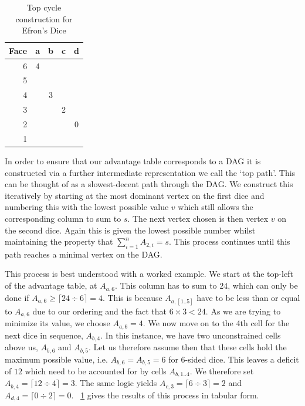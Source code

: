 \documentclass[a4paper,twocolumn]{article}
\begin{document}
\begin{table}
\begin{center}


	\begin{tabular}{|r|c|c|c|c|} 
	\hline
	Face & a & b & c & d  \\ 
	\hline\hline

 6& 4 &   &   &   \\ \hline
 5&  &   &   &   \\ \hline
 4&  & 3 &   &   \\\hline
 3&  &   &  2 &   \\\hline
 2&  &   &   & 0  \\\hline
 1&  &   &   &   \\
 
 	\hline
 	
	 \end{tabular} 

\end{center}
\caption{Top cycle construction for Efron's Dice}
\label{tab:toppath:efron}
\end{table}



In order to ensure that our advantage table corresponds to a DAG it is constructed via a further intermediate representation we call the `top path'. This can be thought of as a slowest-decent path through the DAG. We construct this iteratively by starting at the most dominant vertex on the first dice and numbering this with the lowest possible value $v$ which still allows the corresponding column to sum to $s$. The next vertex chosen is then vertex $v$ on the second dice. Again this is given the lowest possible number whilst maintaining the property that $\sum\limits_{i=1}^n A_{2,i} = s$. This process continues until this path reaches a minimal vertex on the DAG. 

This process is best understood with a worked example. We start at the top-left of the advantage table, at $A_{a,6}$. This column has to sum to $24$, which can only be done if $A_{a,6} \geq \lceil24\div6\rceil = 4$. This is because  $A_{a,[1..5]}$  have to be less than or equal to $A_{a,6}$ due to our ordering and the fact that $6 \times 3 < 24$. As we are trying to minimize its value, we choose $A_{a,6}=4$. We now move on to the 4th cell for the next dice in sequence, $A_{b, 4}$. In this instance, we have two unconstrained cells above us, $A_{b,6}$ and $A_{b,5}$. Let us therefore assume then that these cells hold the maximum possible value, i.e. $A_{b,6} = A_{b,5} = 6$ for 6-sided dice. This leaves a deficit of $12$ which need to be accounted for by cells $A_{b,1..4}$. We therefore set $A_{b,4} = \lceil12\div4\rceil=3$. The same logic yields $A_{c,3}=\lceil6\div3\rceil = 2$ and $A_{d,4}=\lceil0\div2\rceil=0$. \tablename~\ref{tab:toppath:efron} gives the results of this process in tabular form.
\end{document}
